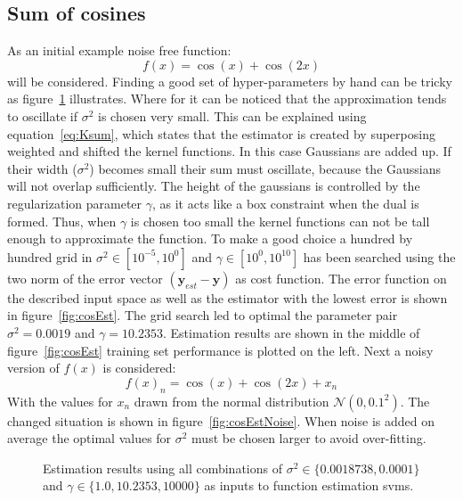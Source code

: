 \subsection{Sum of cosines}
As an initial example noise free function:
\begin{equation}
f(x) = \cos(x) + \cos(2x)
\end{equation}
will be considered. Finding a good set of hyper-parameters by hand can be tricky as figure~\ref{fig:estParamsTricky} illustrates. Where for it can be noticed that the approximation tends to oscillate if $\sigma^2$ is chosen very small. This can be explained using equation~\ref{eq:Ksum}, which states that the estimator is created by superposing weighted and shifted the kernel functions. In this case Gaussians are added up. If their width ($\sigma^2$) becomes small their sum must oscillate, because the Gaussians will not overlap sufficiently. The height of the gaussians is controlled by the regularization parameter $\gamma$, as it acts like a box constraint when the dual is formed. Thus, when $\gamma$ is chosen too small the kernel functions can not be tall enough to approximate the function.  
To make a good choice a hundred by hundred grid in $\sigma^2 \in [10^{-5},10^{0}]$ and $\gamma \in [10^{0},10^{10}]$  has been searched using the two norm of the error vector $(\mathbf{y}_{est} - \mathbf{y})$ as cost function. The error function on the described input space as well as the estimator with the lowest error is shown in figure~\ref{fig:cosEst}. The grid search led to optimal the parameter pair $\sigma^2 = 0.0019$ and $\gamma = 10.2353$. Estimation results are shown in the middle of figure~\ref{fig:cosEst} training set performance is plotted on the left.
Next a noisy version of $f(x)$ is considered:
\begin{equation}
f(x)_n = \cos(x) + \cos(2x) + x_n
\end{equation}
With the values for $x_n$ drawn from the normal distribution $\mathcal{N}(0,0.1^2)$. The changed situation is shown in figure~\ref{fig:cosEstNoise}. When noise is added on average the optimal values for $\sigma^2$ must be chosen larger to avoid 
over-fitting.
\begin{figure}
\centering

\caption{Estimation results using all combinations of $\sigma^2 \in \{0.0018738, 0.0001\}$ and $\gamma \in \{1.0, 10.2353 ,10000 \}$ as inputs to function estimation svms.}
\label{fig:estParamsTricky}
\end{figure}
